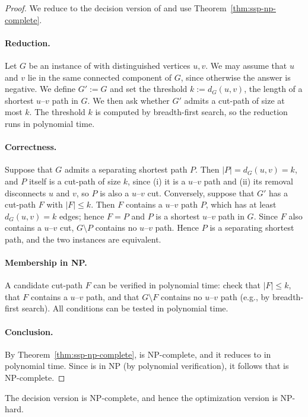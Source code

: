 \begin{proof}
We reduce \SSP{} to the decision version of \MinCutPath{} and use Theorem~\ref{thm:ssp-np-complete}.

\paragraph{Reduction.}
Let $G$ be an instance of \SSP{} with distinguished vertices $u,v$.
We may assume that $u$ and $v$ lie in the same connected component of $G$, since otherwise the answer is negative.
We define $G' := G$ and set the threshold $k := d_G(u,v)$, the length of a shortest $u$--$v$ path in $G$.
We then ask whether $G'$ admits a cut-path of size at most $k$.
The threshold $k$ is computed by breadth-first search, so the reduction runs in polynomial time.

\paragraph{Correctness.}
Suppose that $G$ admits a separating shortest path $P$.
Then $|P| = d_G(u,v) = k$, and $P$ itself is a cut-path of size $k$, since (i) it is a $u$--$v$ path and (ii) its removal disconnects $u$ and $v$, so $P$ is also a $u$--$v$ cut.
Conversely, suppose that $G'$ has a cut-path $F$ with $|F| \leq k$.
Then $F$ contains a $u$--$v$ path $P$, which has at least $d_G(u,v) = k$ edges; hence $F = P$ and $P$ is a shortest $u$--$v$ path in $G$.
Since $F$ also contains a $u$--$v$ cut, $G \setminus P$ contains no $u$--$v$ path.
Hence $P$ is a separating shortest path, and the two instances are equivalent.

\paragraph{Membership in NP.}
A candidate cut-path $F$ can be verified in polynomial time:
check that $|F| \leq k$, that $F$ contains a $u$--$v$ path, and that $G\setminus F$ contains no $u$--$v$ path (e.g., by breadth-first search).
All conditions can be tested in polynomial time.

\paragraph{Conclusion.}
By Theorem~\ref{thm:ssp-np-complete}, \SSP{} is NP-complete, and it reduces to \MinCutPath{} in polynomial time.
Since \MinCutPath{} is in NP (by polynomial verification), it follows that \MinCutPath{} is NP-complete.
\end{proof}

The decision version is NP-complete, and hence the optimization version is NP-hard.

